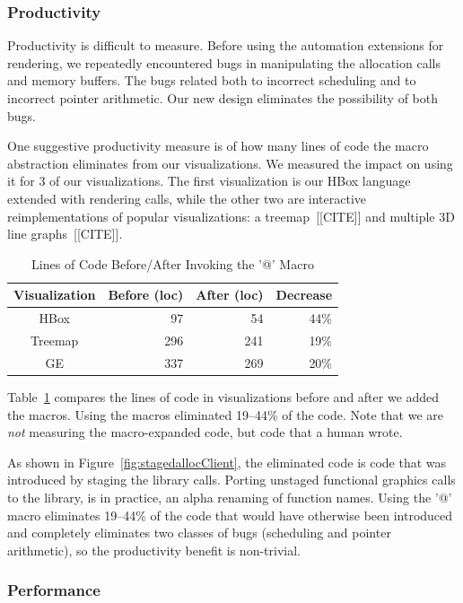\subsubsection{Productivity}
Productivity is difficult to measure. Before using the automation extensions for rendering, we repeatedly encountered bugs in manipulating the allocation calls and memory buffers. The bugs related both to incorrect scheduling and to incorrect pointer arithmetic. Our new design eliminates the possibility of both bugs.

One suggestive productivity measure is of how many lines of code the macro abstraction eliminates from our visualizations. We measured the impact on using it for 3 of our visualizations. The first visualization is our HBox language extended with rendering calls, while the other two are interactive reimplementations of popular visualizations: a treemap~[[CITE]] and multiple 3D line graphs~[[CITE]].


\begin{table}[ht]
\caption{Lines of Code Before/After Invoking the '@' Macro}
\centering
\begin{tabular}{c r r r}
\hline\hline
 \textbf{Visualization} & \textbf{Before (loc)} & \textbf{After (loc)} & \textbf{Decrease} \\ [0.5ex] \hline
  HBox & 97 & 54 & 44\% \\
  Treemap & 296 & 241 & 19\% \\
  GE & 337 & 269 & 20\% \\ [1ex] 
\hline
\end{tabular}
\label{table:macroreduction}
\end{table}
Table~\ref{table:macroreduction} compares the lines of code in visualizations before and after we added the macros. Using the macros eliminated 19--44\% of the code. Note that we are \emph{not} measuring the macro-expanded code, but code that a human wrote.



As shown in Figure~\ref{fig:stagedallocClient}, the eliminated code is code that was introduced by staging the library calls. Porting unstaged functional graphics calls to the library, is in practice, an alpha renaming of function names.  Using the '@' macro eliminates 19--44\% of the code that would have otherwise been introduced and completely eliminates two classes of bugs (scheduling and pointer arithmetic), so the productivity benefit is non-trivial. 

\subsubsection{Performance}



